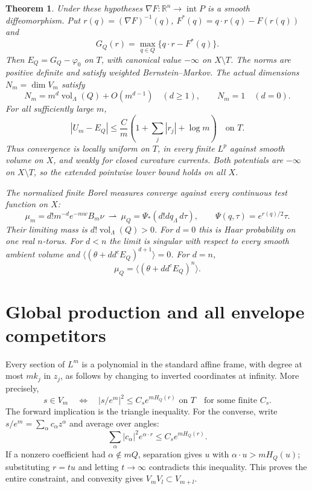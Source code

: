 \documentclass[11pt]{article}
\newtheorem{theorem}{Theorem}
\newcommand{\ddc}{dd^c}
\newcommand{\R}{\mathbb R}
\newcommand{\vol}{\operatorname{vol}}
\newcommand{\NP}[1]{\langle #1\rangle}
\begin{document}
\begin{theorem}\label{thm:main}
Under these hypotheses $\nabla F:\R^n\to\operatorname{int}P$ is a
smooth diffeomorphism. Put $r(q)=(\nabla F)^{-1}(q)$,
$F^*(q)=q\cdot r(q)-F(r(q))$ and
\[
 G_Q(r)=\max_{q\in Q}\{q\cdot r-F^*(q)\}.
\]
Then $E_Q=G_Q-\varphi_0$ on $T$, with canonical value $-\infty$
on $X\setminus T$. The norms are positive definite and satisfy weighted
Bernstein--Markov. The actual dimensions $N_m=\dim V_m$ satisfy
\[
 N_m=m^d\vol_\Lambda(Q)+O(m^{d-1})\quad(d\geq1),
 \qquad N_m=1\quad(d=0).
\]
For all sufficiently large $m$,
\begin{equation}\label{eq:error}
 |U_m-E_Q|\leq\frac{C}{m}
                \left(1+\sum_j|r_j|+\log m\right)\quad\text{on }T.
\end{equation}
Thus convergence is locally uniform on $T$, in every finite $L^p$
against smooth volume on $X$, and weakly for closed curvature currents.
Both potentials are $-\infty$ on $X\setminus T$, so the extended
pointwise lower bound holds on all $X$.

The normalized finite Borel measures converge against every continuous
test function on $X$:
\begin{equation}\label{eq:limit}
 \mu_m=d!m^{-d}e^{-mw}B_m\nu\ \rightharpoonup\
 \mu_Q=\Psi_*(d!dq_\Lambda\,d\tau),\qquad
 \Psi(q,\tau)=e^{r(q)/2}\tau.
\end{equation}
Their limiting mass is $d!\vol_\Lambda(Q)>0$. For $d=0$ this is
Haar probability on one real $n$-torus. For $d<n$ the limit is singular
with respect to every smooth ambient volume and
$\NP{(\theta+\ddc E_Q)^{d+1}}=0$. For $d=n$,
\begin{equation}\label{eq:fullma}
 \mu_Q=\NP{(\theta+\ddc E_Q)^n}.
\end{equation}
\end{theorem}

\section{Global production and all envelope competitors}
Every section of $L^m$ is a polynomial in the standard affine frame,
with degree at most $mk_j$ in $z_j$, as follows by changing to inverted
coordinates at infinity. More precisely,
\begin{equation}\label{eq:entire}
 s\in V_m\quad\Longleftrightarrow\quad
 |s/e^m|^2\leq C_s e^{mH_Q(r)}\text{ on }T
 \quad\text{for some finite }C_s.
\end{equation}
The forward implication is the triangle inequality. For the converse,
write $s/e^m=\sum_\alpha c_\alpha z^\alpha$ and average over angles:
\[
 \sum_\alpha|c_\alpha|^2e^{\alpha\cdot r}
                   \leq C_s e^{mH_Q(r)}.
\]
If a nonzero coefficient had $\alpha\notin mQ$, separation gives
$u$ with $\alpha\cdot u>mH_Q(u)$; substituting $r=tu$ and letting
$t\to\infty$ contradicts this inequality. This proves the entire
constraint, and convexity gives $V_mV_l\subset V_{m+l}$.
\end{document}
